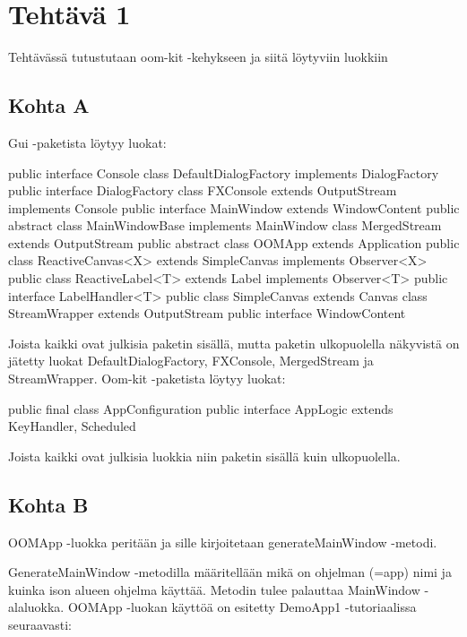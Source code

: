 
\chapter{Tehtävä 1 \label{chap:Teht=0000E4v=0000E4-1}}

Tehtävässä tutustutaan oom-kit -kehykseen ja siitä löytyviin luokkiin

\section{Kohta A}

\label{Kohta A}

Gui -paketista löytyy luokat:

\begin{javacode}
public interface Console {}
class DefaultDialogFactory implements DialogFactory {}
public interface DialogFactory {}
class FXConsole extends OutputStream implements Console {}
public interface MainWindow extends WindowContent {}
public abstract class MainWindowBase implements MainWindow {}
class MergedStream extends OutputStream {}
public abstract class OOMApp extends Application {}
public class ReactiveCanvas<X> extends SimpleCanvas implements Observer<X> {}
public class ReactiveLabel<T> extends Label implements Observer<T> {
	public interface LabelHandler<T> {}
}
public class SimpleCanvas extends Canvas {}
class StreamWrapper extends OutputStream {}
public interface WindowContent {}
\end{javacode}

Joista kaikki ovat julkisia paketin sisällä, mutta paketin ulkopuolella
näkyvistä on jätetty luokat DefaultDialogFactory, FXConsole, MergedStream ja
StreamWrapper. Oom-kit -paketista löytyy luokat:

\begin{javacode}
public final class AppConfiguration {}
public interface AppLogic extends KeyHandler, Scheduled {}
\end{javacode}

Joista kaikki ovat julkisia luokkia niin paketin sisällä kuin ulkopuolella.

\section{Kohta B}

\label{Kohta B}
 
OOMApp -luokka peritään ja sille kirjoitetaan generateMainWindow -metodi.

GenerateMainWindow -metodilla määritellään mikä on ohjelman (=app) nimi ja
kuinka ison alueen ohjelma käyttää. Metodin tulee palauttaa MainWindow
-alaluokka. OOMApp -luokan käyttöä on esitetty DemoApp1 -tutoriaalissa
seuraavasti:

